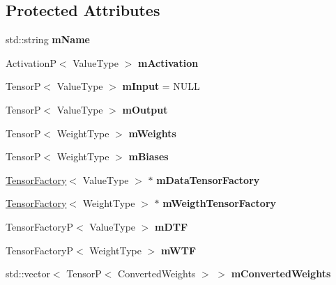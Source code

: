 \subsection*{Protected Attributes}
\begin{DoxyCompactItemize}
\item 
\mbox{\label{classLayer_a8a508508fae922c38007eb8319041fb9}} 
std\+::string {\bfseries m\+Name}
\item 
\mbox{\label{classLayer_a4361c9c4065fe5c60234a6483bccb2ae}} 
ActivationP$<$ Value\+Type $>$ {\bfseries m\+Activation}
\item 
\mbox{\label{classLayer_ad067632eddb3b78c793e4db416743cb5}} 
TensorP$<$ Value\+Type $>$ {\bfseries m\+Input} = N\+U\+LL
\item 
\mbox{\label{classLayer_a093c45677836e0eb0d340203c2b7c530}} 
TensorP$<$ Value\+Type $>$ {\bfseries m\+Output}
\item 
\mbox{\label{classLayer_a17cfb470494dba90c0af4e0537b55792}} 
TensorP$<$ Weight\+Type $>$ {\bfseries m\+Weights}
\item 
\mbox{\label{classLayer_a5ced22851d156d792c8790c504705d27}} 
TensorP$<$ Weight\+Type $>$ {\bfseries m\+Biases}
\item 
\mbox{\label{classLayer_a8d7174f4fae221a126525ab9a106bce1}} 
\hyperlink{classTensorFactory}{Tensor\+Factory}$<$ Value\+Type $>$ $\ast$ {\bfseries m\+Data\+Tensor\+Factory}
\item 
\mbox{\label{classLayer_ab3b6a9517c3baa451bf765c1d557a7fc}} 
\hyperlink{classTensorFactory}{Tensor\+Factory}$<$ Weight\+Type $>$ $\ast$ {\bfseries m\+Weigth\+Tensor\+Factory}
\item 
\mbox{\label{classLayer_ae4202d2ab733d8d6654c9babaad1a1d9}} 
Tensor\+FactoryP$<$ Value\+Type $>$ {\bfseries m\+D\+TF}
\item 
\mbox{\label{classLayer_aa11a9dce0ccc4c7c8a58f3c6b4a81922}} 
Tensor\+FactoryP$<$ Weight\+Type $>$ {\bfseries m\+W\+TF}
\item 
\mbox{\label{classLayer_a2141c4c8cecb1f4d07d5cbad56bf72ea}} 
std\+::vector$<$ TensorP$<$ Converted\+Weights $>$ $>$ {\bfseries m\+Converted\+Weights}
\end{DoxyCompactItemize}
